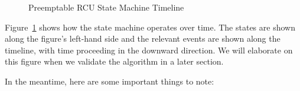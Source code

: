 \begin{figure}[htb]
\begin{center}
\end{center}
\caption{Preemptable RCU State Machine Timeline}
\label{app:rcuimpl:Preemptable RCU State Machine Timeline}
\end{figure}

Figure~\ref{app:rcuimpl:Preemptable RCU State Machine Timeline}
shows how the state machine operates over time.
The states are shown along the figure's left-hand side and the relevant events
are shown along the timeline, with time proceeding in the downward direction.
We will elaborate on this figure when we validate the algorithm in
a later section.

In the meantime, here are some important things to note:

